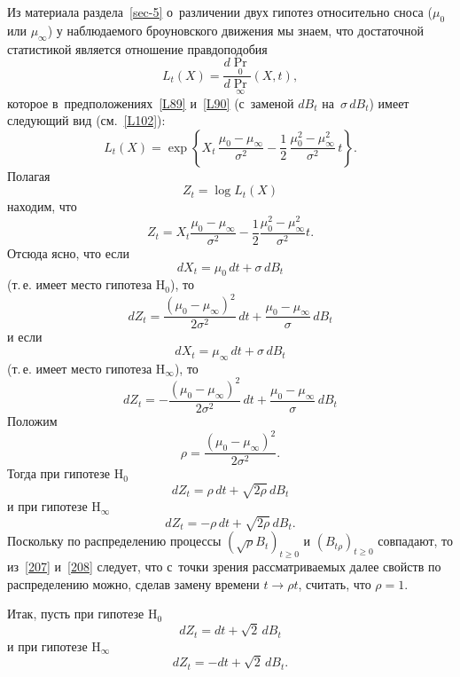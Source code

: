 Из материала раздела~\ref{sec-5} о~различении двух гипотез
относительно сноса ($\mu_0$ или $\mu_{\infty}$) у наблюдаемого
броуновского движения мы знаем, что достаточной статистикой
является отношение правдоподобия
\begin{equation}
\label{202}%
L_t(X)=\frac{d\Pr_0}{d\Pr_{\infty}}(X,t),
\end{equation}
которое в~предположениях~\eqref{L89} и~\eqref{L90} (с~заменой
$dB_t$ на~$\sigma\,dB_t$) имеет следующий вид (см.~\eqref{L102}):
\begin{equation}
\label{203}%
L_t(X)
=\exp\left\{X_t\,\frac{\mu_0-\mu_{\infty}}{\sigma^2}-
\frac12\,\frac{\mu_0^2-\mu_{\infty}^2}{\sigma^2}\,t\right\}.
\end{equation}
Полагая
\[
Z_t=\log L_t(X)
\]
находим, что
\begin{equation}
\label{204}%
Z_t=X_t\frac{\mu_0-\mu_{\infty}}{\sigma^2}-
\frac12\frac{\mu_0^2-\mu_{\infty}^2}{\sigma^2}t.
\end{equation}
Отсюда ясно, что если
\[
dX_t=\mu_0\,dt+\sigma\,dB_t
\]
(т.\,е. имеет место гипотеза $\mathrm{H}_0$), то
\begin{equation}
\label{205}%
dZ_t=\frac{(\mu_0-\mu_{\infty})^2}{2\sigma^2}\,dt+\frac{\mu_0-\mu_{\infty}}{\sigma}\,dB_t
\end{equation}
и если
\[
dX_t=\mu_{\infty}\,dt+\sigma\,dB_t
\]
(т.\,е. имеет место гипотеза $\mathrm{H}_{\infty}$), то
\begin{equation}
\label{206}%
dZ_t=-\frac{(\mu_0-\mu_{\infty})^2}{2\sigma^2}\,dt+\frac{\mu_0-\mu_{\infty}}{\sigma}\,dB_t
\end{equation}
Положим
\[
\rho=\frac{(\mu_0-\mu_{\infty})^2}{2\sigma^2}.
\]
Тогда при гипотезе $\mathrm{H}_0$
\begin{equation}
\label{207}%
dZ_t=\rho\,dt+\sqrt{2\rho}\,dB_t
\end{equation}
и при гипотезе $\mathrm{H}_{\infty}$
\begin{equation}
\label{208}%
dZ_t=-\rho\,dt+\sqrt{2\rho}\,dB_t.
\end{equation}
Поскольку по распределению процессы $\left(\sqrt{\rho}B_t\right)_{t\ge0}$
и $\left( B_{t\rho}\right)_{t\ge0}$ совпадают, то из~\eqref{207}
и~\eqref{208} следует, что с~точки зрения рассматриваемых далее
свойств по распределению можно, сделав замену времени $t\to\rho
t$, считать, что $\rho=1$.

Итак, пусть при гипотезе $\mathrm{H}_0$
\begin{equation}
\label{209}%
dZ_t=dt+\sqrt{2}\,dB_t
\end{equation}
и при гипотезе $\mathrm{H}_{\infty}$
\begin{equation}
\label{210}%
dZ_t=-dt+\sqrt{2}\,dB_t.
\end{equation}

